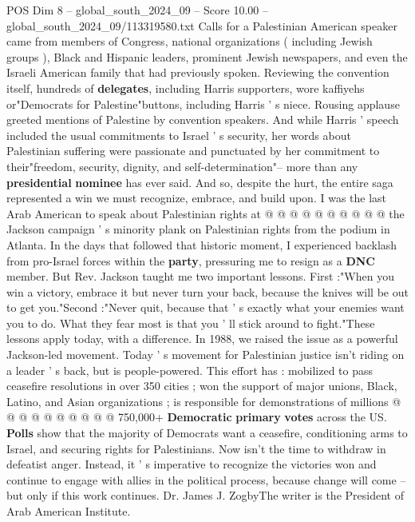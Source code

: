 \begin{textsample}{POS Dim 8 – global\_south\_2024\_09 – Score 10.00 – global\_south\_2024\_09/113319580.txt}
Calls for a Palestinian American speaker came from members of Congress, national organizations ( including Jewish groups ), Black and Hispanic leaders, prominent Jewish newspapers, and even the Israeli American family that had previously spoken.
Reviewing the convention itself, hundreds of \textbf{delegates}, including Harris supporters, wore kaffiyehs or"Democrats for Palestine"buttons, including Harris ' s niece.
Rousing applause greeted mentions of Palestine by convention speakers.
And while Harris ' speech included the usual commitments to Israel ' s security, her words about Palestinian suffering were passionate and punctuated by her commitment to their"freedom, security, dignity, and self-determination"-- more than any \textbf{presidential} \textbf{nominee} has ever said.
And so, despite the hurt, the entire saga represented a win we must recognize, embrace, and build upon.
I was the last Arab American to speak about Palestinian rights at @ @ @ @ @ @ @ @ @ @ the Jackson campaign ' s minority plank on Palestinian rights from the podium in Atlanta.
In the days that followed that historic moment, I experienced backlash from pro-Israel forces within the \textbf{party}, pressuring me to resign as a \textbf{DNC} member.
But Rev.
Jackson taught me two important lessons.
First :"When you win a victory, embrace it but never turn your back, because the knives will be out to get you."Second :"Never quit, because that ' s exactly what your enemies want you to do.
What they fear most is that you ' ll stick around to fight."These lessons apply today, with a difference.
In 1988, we raised the issue as a powerful Jackson-led movement.
Today ' s movement for Palestinian justice isn't riding on a leader ' s back, but is people-powered.
This effort has : mobilized to pass ceasefire resolutions in over 350 cities ; won the support of major unions, Black, Latino, and Asian organizations ; is responsible for demonstrations of millions @ @ @ @ @ @ @ @ @ @ 750,000+ \textbf{Democratic} \textbf{primary} \textbf{votes} across the US. \textbf{Polls} show that the majority of Democrats want a ceasefire, conditioning arms to Israel, and securing rights for Palestinians.
Now isn't the time to withdraw in defeatist anger.
Instead, it ' s imperative to recognize the victories won and continue to engage with allies in the political process, because change will come -- but only if this work continues.
Dr.
James J.
ZogbyThe writer is the President of Arab American Institute.

\end{textsample}
